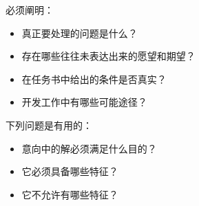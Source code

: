 \documentclass[letterpaper,10pt,english]{sphinxmanual}
\begin{document}
必须阐明：
\begin{itemize}
\item {} 
真正要处理的问题是什么？

\item {} 
存在哪些往往未表达出来的愿望和期望？

\item {} 
在任务书中给出的条件是否真实？

\item {} 
开发工作中有哪些可能途径？

\end{itemize}

下列问题是有用的：
\begin{itemize}
\item {} 
意向中的解必须满足什么目的？

\item {} 
它必须具备哪些特征？

\item {} 
它不允许有哪些特征？

\end{itemize}
\end{document}
